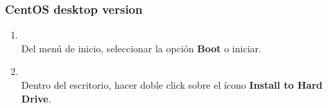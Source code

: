 \documentclass[11pt]{article}
\begin{document}
	\subsubsection{CentOS desktop version}	
		\begin{enumerate}
			\item 
				\begin{minipage}[t]{\linewidth}
			        \raggedright
			        \medskip
			        \\Del menú de inicio, seleccionar la opción \textbf{Boot} o iniciar. 
		        \end{minipage}

		    \item
		    	\begin{minipage}[t]{\linewidth}
			        \raggedright
			        \medskip
			        \\Dentro del escritorio, hacer doble click sobre el ícono \textbf{Install to Hard Drive}. 
		        \end{minipage}	


\end{enumerate}
\end{document}
